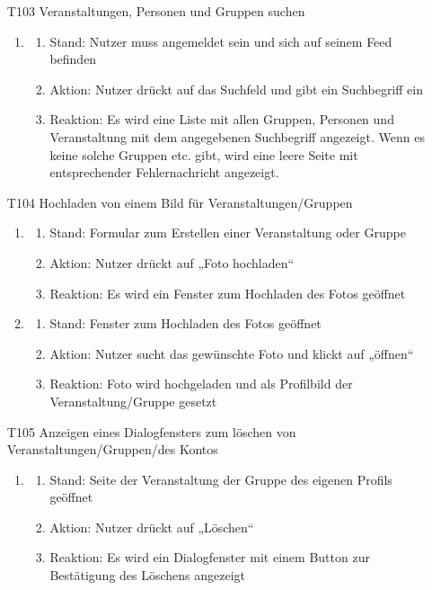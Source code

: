 \documentclass[parskip=full]{scrartcl}
\begin{document}
\begin{itemize}
		
		
		\item[T103] Veranstaltungen, Personen und Gruppen suchen
		\begin{enumerate}
			\item
			\begin{enumerate}[nosep]	
				\item Stand: Nutzer muss angemeldet sein und sich auf seinem \gls{Feed} befinden
				\item Aktion: Nutzer  drückt auf das Suchfeld und gibt ein Suchbegriff ein
				\item Reaktion: Es wird eine Liste mit allen Gruppen, Personen und Veranstaltung mit dem angegebenen Suchbegriff angezeigt. Wenn es keine solche Gruppen etc. gibt, wird eine leere Seite mit entsprechender Fehlernachricht angezeigt.
			\end{enumerate} 
		\end{enumerate}
		
		
		
		
		\item[T104]  Hochladen von einem Bild für Veranstaltungen/Gruppen
		\begin{enumerate}
			\item
			\begin{enumerate}[nosep]	
				\item Stand: Formular zum Erstellen einer Veranstaltung oder Gruppe 
				\item Aktion: Nutzer drückt auf „Foto hochladen“
				\item Reaktion:  Es  wird ein Fenster zum Hochladen des Fotos geöffnet
			\end{enumerate} 
			\item
			\begin{enumerate}[nosep]	
				\item Stand: Fenster zum Hochladen des Fotos geöffnet
				\item Aktion: Nutzer sucht das gewünschte Foto und klickt auf „öffnen“
				\item Reaktion: Foto wird hochgeladen und als Profilbild der Veranstaltung/Gruppe gesetzt
			\end{enumerate}
		\end{enumerate}
		
		\item[T105] Anzeigen eines Dialogfensters zum löschen von Veranstaltungen/Gruppen/des Kontos
		\begin{enumerate}
			\item
			\begin{enumerate}[nosep]	
				\item Stand:  Seite der Veranstaltung der Gruppe des eigenen Profils  geöffnet
				\item Aktion: Nutzer drückt auf „Löschen“
				\item Reaktion: Es  wird ein Dialogfenster mit einem \gls{Button} zur Bestätigung des Löschens  angezeigt
			\end{enumerate} 
		\end{enumerate}
		

\end{itemize}
\end{document}
